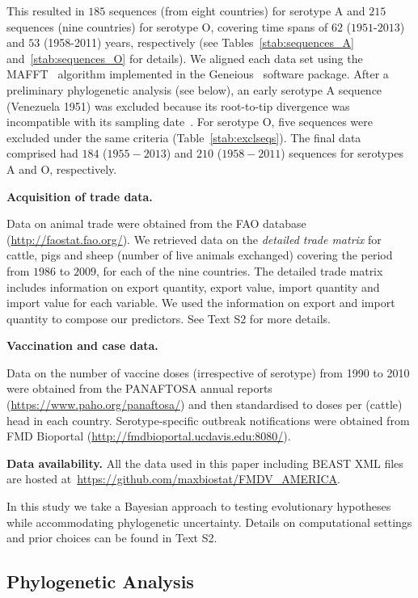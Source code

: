\documentclass[10pt]{article}
\begin{document}
This resulted in $185$ sequences (from eight countries) for serotype A and $215$ sequences (nine countries) for serotype O, covering time spans of $62$ ($1951$-$2013$) and $53$ (1958-2011) years, respectively (see Tables~\ref{stab:sequences_A} and~\ref{stab:sequences_O} for details).
We aligned each data set using the MAFFT~\citep{Katoh2002} algorithm implemented in the Geneious~\citep{Kearse2012} software package.
After a preliminary phylogenetic analysis (see below), an early serotype A sequence (Venezuela 1951) was excluded because its root-to-tip divergence was incompatible with its sampling date~\citep{Rambaut2016}.
For serotype O, five sequences were excluded under the same criteria (Table~\ref{stab:exclseqs}).
The final data comprised had $184$ ($1955-2013$) and $210$ ($1958-2011$) sequences for serotypes A and O, respectively.

\textbf{Acquisition of trade data.}

Data on animal trade were obtained from the FAO database (\url{http://faostat.fao.org/}).
We retrieved data on the \textit{detailed trade matrix} %
for cattle, pigs and sheep (number of live animals exchanged) covering the period from $1986$ to $2009$, for each of the nine countries.
The detailed trade matrix includes information on export quantity, export value, import quantity and import value for each variable.
We used the information on export and import quantity to compose our predictors.
See Text S2 for more details.

\textbf{Vaccination and case data.}

Data on the number of vaccine doses (irrespective of serotype) from 1990 to 2010 were obtained from the PANAFTOSA annual reports (\url{https://www.paho.org/panaftosa/}) and then standardised to doses per (cattle) head in each country.
Serotype-specific outbreak notifications were obtained from FMD Bioportal (\url{http://fmdbioportal.ucdavis.edu:8080/}).

\textbf{Data availability.} All the data used in this paper including BEAST XML files are hosted at~\url{https://github.com/maxbiostat/FMDV_AMERICA}.

In this study we take a Bayesian approach to testing evolutionary hypotheses while accommodating phylogenetic uncertainty.
Details on computational settings and prior choices can be found in Text S2.

\subsection*{Phylogenetic Analysis}
\end{document}
